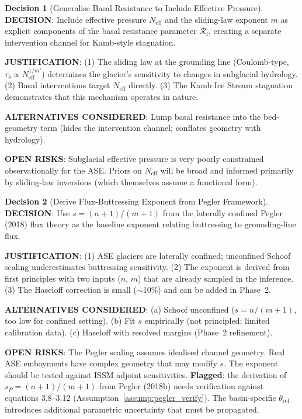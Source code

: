 \documentclass[11pt]{article}
\theoremstyle{definition}
\newtheorem{decision}{Decision}
\begin{document}
\begin{decision}[Generalise Basal Resistance to Include Effective Pressure]
\textbf{DECISION}: Include effective pressure $N_{\text{eff}}$ and the sliding-law exponent $m$ as explicit components of the basal resistance parameter $\mathcal{R}_i$, creating a separate intervention channel for Kamb-style stagnation.

\textbf{JUSTIFICATION}: (1) The sliding law at the grounding line (Coulomb-type, $\tau_b \propto N_{\text{eff}}^{1/m'}$) determines the glacier's sensitivity to changes in subglacial hydrology. (2) Basal interventions target $N_{\text{eff}}$ directly. (3) The Kamb Ice Stream stagnation demonstrates that this mechanism operates in nature.

\textbf{ALTERNATIVES CONSIDERED}: Lump basal resistance into the bed-geometry term (hides the intervention channel; conflates geometry with hydrology).

\textbf{OPEN RISKS}: Subglacial effective pressure is very poorly constrained observationally for the ASE.  Priors on $N_{\text{eff}}$ will be broad and informed primarily by sliding-law inversions (which themselves assume a functional form).
\end{decision}

\begin{decision}[Derive Flux-Buttressing Exponent from Pegler Framework]
\textbf{DECISION}: Use $s = (n+1)/(m+1)$ from the laterally confined Pegler (2018) flux theory as the baseline exponent relating buttressing to grounding-line flux.

\textbf{JUSTIFICATION}: (1) ASE glaciers are laterally confined; unconfined Schoof scaling underestimates buttressing sensitivity. (2) The exponent is derived from first principles with two inputs ($n$, $m$) that are already sampled in the inference. (3) The Haseloff correction is small ($\sim$10\%) and can be added in Phase~2.

\textbf{ALTERNATIVES CONSIDERED}: (a) Schoof unconfined ($s = n/(m+1)$, too low for confined setting). (b) Fit $s$ empirically (not principled; limited calibration data). (c) Haseloff with resolved margins (Phase~2 refinement).

\textbf{OPEN RISKS}: The Pegler scaling assumes idealised channel geometry.  Real ASE embayments have complex geometry that may modify $s$.  The exponent should be tested against ISSM adjoint sensitivities.  \textbf{Flagged}: the derivation of $s_P = (n+1)/(m+1)$ from Pegler (2018b) needs verification against equations 3.8--3.12 (Assumption~\ref{assump:pegler_verify}).  The basin-specific $\theta_{\text{ref}}$ introduces additional parametric uncertainty that must be propagated.
\end{decision}
\end{document}
